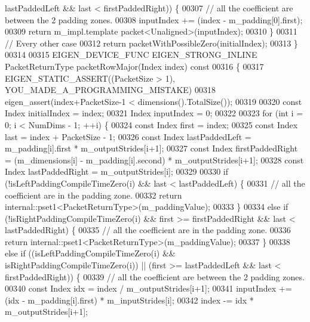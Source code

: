 \begin{DoxyCode}
      lastPaddedLeft && last < firstPaddedRight)) \{
00307       \textcolor{comment}{// all the coefficient are between the 2 padding zones.}
00308       inputIndex += (index - m\_padding[0].first);
00309       \textcolor{keywordflow}{return} m\_impl.template packet<Unaligned>(inputIndex);
00310     \}
00311     \textcolor{comment}{// Every other case}
00312     \textcolor{keywordflow}{return} packetWithPossibleZero(initialIndex);
00313   \}
00314 
00315   EIGEN\_DEVICE\_FUNC EIGEN\_STRONG\_INLINE PacketReturnType packetRowMajor(Index index)\textcolor{keyword}{ const}
00316 \textcolor{keyword}{  }\{
00317     EIGEN\_STATIC\_ASSERT((PacketSize > 1), YOU\_MADE\_A\_PROGRAMMING\_MISTAKE)
00318     eigen\_assert(index+PacketSize-1 < dimensions().TotalSize());
00319 
00320     \textcolor{keyword}{const} Index initialIndex = index;
00321     Index inputIndex = 0;
00322 
00323     \textcolor{keywordflow}{for} (\textcolor{keywordtype}{int} i = 0; i < NumDims - 1; ++i) \{
00324       \textcolor{keyword}{const} Index first = index;
00325       \textcolor{keyword}{const} Index last = index + PacketSize - 1;
00326       \textcolor{keyword}{const} Index lastPaddedLeft = m\_padding[i].first * m\_outputStrides[i+1];
00327       \textcolor{keyword}{const} Index firstPaddedRight = (m\_dimensions[i] - m\_padding[i].second) * m\_outputStrides[i+1];
00328       \textcolor{keyword}{const} Index lastPaddedRight = m\_outputStrides[i];
00329 
00330       \textcolor{keywordflow}{if} (!isLeftPaddingCompileTimeZero(i) && last < lastPaddedLeft) \{
00331         \textcolor{comment}{// all the coefficient are in the padding zone.}
00332         \textcolor{keywordflow}{return} internal::pset1<PacketReturnType>(m\_paddingValue);
00333       \}
00334       \textcolor{keywordflow}{else} \textcolor{keywordflow}{if} (!isRightPaddingCompileTimeZero(i) && first >= firstPaddedRight && last < lastPaddedRight) \{
00335         \textcolor{comment}{// all the coefficient are in the padding zone.}
00336         \textcolor{keywordflow}{return} internal::pset1<PacketReturnType>(m\_paddingValue);
00337       \}
00338       \textcolor{keywordflow}{else} \textcolor{keywordflow}{if} ((isLeftPaddingCompileTimeZero(i) && isRightPaddingCompileTimeZero(i)) || (first >= 
      lastPaddedLeft && last < firstPaddedRight)) \{
00339         \textcolor{comment}{// all the coefficient are between the 2 padding zones.}
00340         \textcolor{keyword}{const} Index idx = index / m\_outputStrides[i+1];
00341         inputIndex += (idx - m\_padding[i].first) * m\_inputStrides[i];
00342         index -= idx * m\_outputStrides[i+1];

\end{DoxyCode}
